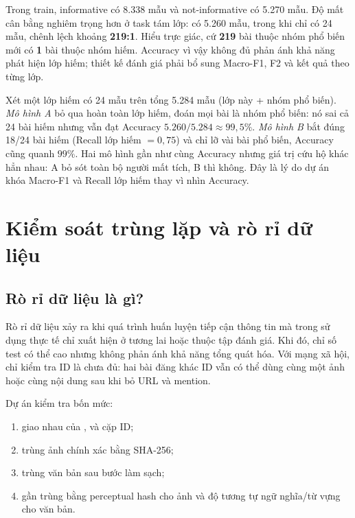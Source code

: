 Trong train, informative có 8.338 mẫu và not-informative có 5.270 mẫu. Độ mất
cân bằng nghiêm trọng hơn ở task tám lớp:  có 5.260 mẫu,
trong khi  chỉ có 24 mẫu, chênh lệch khoảng
\textbf{219:1}. Hiểu trực giác, cứ \textbf{219} bài thuộc nhóm phổ biến mới có
\textbf{1} bài thuộc nhóm hiếm. Accuracy vì vậy không đủ phản ánh khả năng phát
hiện lớp hiếm; thiết kế đánh giá phải bổ sung Macro-F1, F2 và kết quả theo từng
lớp.

\begin{insight}
Xét một lớp hiếm có 24 mẫu trên tổng 5.284 mẫu (lớp này + nhóm phổ biến).
\emph{Mô hình A} bỏ qua hoàn toàn lớp hiếm, đoán mọi bài là nhóm phổ biến: nó
sai cả 24 bài hiếm nhưng vẫn đạt Accuracy $5.260/5.284 \approx 99{,}5\%$.
\emph{Mô hình B} bắt đúng 18/24 bài hiếm (Recall lớp hiếm $=0{,}75$) và chỉ lỡ
vài bài phổ biến, Accuracy cũng quanh $99\%$. Hai mô hình gần như cùng Accuracy
nhưng giá trị cứu hộ khác hẳn nhau: A bỏ sót toàn bộ người mất tích, B thì
không. Đây là lý do dự án khóa Macro-F1 và Recall lớp hiếm thay vì nhìn Accuracy.
\end{insight}

\section{Kiểm soát trùng lặp và rò rỉ dữ liệu}

\subsection{Rò rỉ dữ liệu là gì?}

Rò rỉ dữ liệu xảy ra khi quá trình huấn luyện tiếp cận thông tin mà trong sử dụng
thực tế chỉ xuất hiện ở tương lai hoặc thuộc tập đánh giá. Khi đó, chỉ số test có
thể cao nhưng không phản ánh khả năng tổng quát hóa. Với mạng xã hội, chỉ kiểm
tra ID là chưa đủ: hai bài đăng khác ID vẫn có thể dùng cùng một ảnh hoặc cùng
nội dung sau khi bỏ URL và mention.

Dự án kiểm tra bốn mức:

\begin{enumerate}[leftmargin=*]
  \item giao nhau của ,  và cặp ID;
  \item trùng ảnh chính xác bằng SHA-256;
  \item trùng văn bản sau bước làm sạch;
  \item gần trùng bằng perceptual hash cho ảnh và độ tương tự ngữ nghĩa/từ vựng
        cho văn bản.
\end{enumerate}

